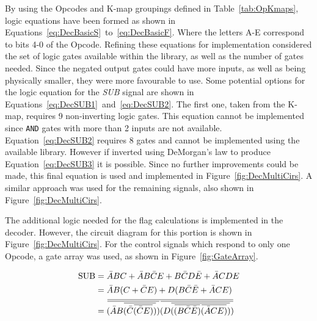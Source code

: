 By using the Opcodes and K-map groupings defined in Table~\ref{tab:OpKmaps}, logic equations have been formed as shown in Equations~\eqref{eq:DecBasicS}~to~\eqref{eq:DecBasicF}. 
Where the letters A-E correspond to bits 4-0 of the Opcode. 
Refining these equations for implementation considered the set of logic gates available within the library, as well as the number of gates needed. 
Since the negated output gates could have more inputs, as well as being physically smaller, they were more favourable to use. 
Some potential options for the logic equation for the \textit{SUB} signal are shown in Equations~\eqref{eq:DecSUB1}~and~\eqref{eq:DecSUB2}. 
The first one, taken from the K-map, requires 9 non-inverting logic gates. 
This equation cannot be implemented since \texttt{AND} gates with more than 2 inputs are not available. 
Equation~\eqref{eq:DecSUB2} requires 8 gates and cannot be implemented using the available library.
However if inverted using DeMorgan's law to produce Equation~\eqref{eq:DecSUB3} it is possible.
Since no further improvements could be made, this final equation is used and implemented in Figure~\ref{fig:DecMultiCirs}. A similar approach was used for the remaining signals, also shown in Figure~\ref{fig:DecMultiCirs}. 

The additional logic needed for the flag calculations is implemented in the decoder. 
However, the circuit diagram for this portion is shown in Figure~\ref{fig:DecMultiCirs}. 
For the control signals which respond to only one Opcode, a gate array was used, as shown in Figure~\ref{fig:GateArray}. 

\newcommand{\overbar}[1]{\mkern 1.5mu\overline{\mkern-1.5mu#1\mkern-1.5mu}\mkern 1.5mu}
\begin{align}
	\text{SUB} &= \bar{A}BC + \bar{A}B\bar{C}E + B\bar{C}D\bar{E} + \bar{A}CDE \label{eq:DecSUB1}\\
	&= \bar{A}B(C + \bar{C}E) + D(B\bar{C}\bar{E} + \bar{A}CE) \label{eq:DecSUB2}\\
	&= \overbar{\overbar{(\bar{A}B\overbar{(\bar{C}\overbar{(\bar{C}E)})})}\overbar{(D\overbar{(\overbar{(B\bar{C}\bar{E})}\overbar{(\bar{A}CE)})})}} \label{eq:DecSUB3}
\end{align}

